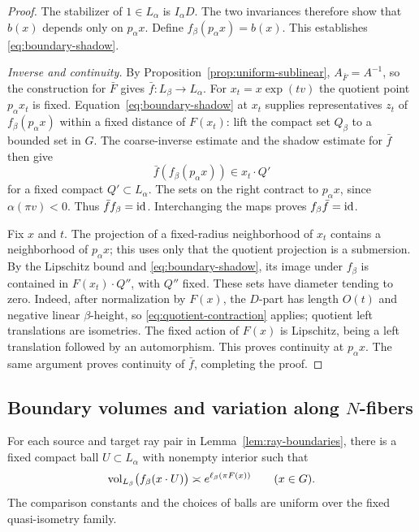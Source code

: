 \begin{proof}
The stabilizer of $1\in L_\alpha$ is $I_\alpha D$.
The two invariances therefore show that $b(x)$ depends only on
$p_\alpha x$.  Define $f_\beta(p_\alpha x)=b(x)$.
This establishes \eqref{eq:boundary-shadow}.

\smallskip
\noindent\emph{Inverse and continuity.}
By Proposition~\ref{prop:uniform-sublinear},
$A_{\bar F}=A^{-1}$, so the construction for $\bar F$ gives
$\bar f:L_\beta\to L_\alpha$.
For $x_t=x\exp(tv)$ the quotient point $p_\alpha x_t$ is fixed.
Equation~\eqref{eq:boundary-shadow} at $x_t$ supplies representatives
$z_t$ of $f_\beta(p_\alpha x)$ within a fixed distance of $F(x_t)$:
lift the compact set $Q_\beta$ to a bounded set in $G$.
The coarse-inverse estimate and the shadow estimate for $\bar f$
then give
\[
 \bar f(f_\beta(p_\alpha x))\in x_t\cdot Q'
\]
for a fixed compact $Q'\subset L_\alpha$.
The sets on the right contract to $p_\alpha x$, since
$\alpha(\pi v)<0$.  Thus $\bar f f_\beta=\operatorname{id}$.
Interchanging the maps proves $f_\beta\bar f=\operatorname{id}$.

Fix $x$ and $t$.  The projection of a fixed-radius neighborhood
of $x_t$ contains a neighborhood of $p_\alpha x$; this uses only
that the quotient projection is a submersion.
By the Lipschitz bound and \eqref{eq:boundary-shadow}, its image
under $f_\beta$ is contained in $F(x_t)\cdot Q''$, with $Q''$
fixed.  These sets have diameter tending to zero.
Indeed, after normalization by $F(x)$, the $D$-part has length
$O(t)$ and negative linear $\beta$-height, so
\eqref{eq:quotient-contraction} applies; quotient left translations
are isometries.  The fixed action of $F(x)$ is Lipschitz, being
a left translation followed by an automorphism.
This proves continuity at $p_\alpha x$.  The same argument proves
continuity of $\bar f$, completing the proof.
\end{proof}

\subsection{Boundary volumes and variation along \texorpdfstring{$N$}{N}-fibers}

\begin{lemma}
\label{lem:boundary-volume}
For each source and target ray pair in Lemma~\ref{lem:ray-boundaries},
there is a fixed compact ball $U\subset L_\alpha$ with nonempty
interior such that
\begin{equation}
\label{eq:boundary-volume}
 \operatorname{vol}_{L_\beta}\bigl(f_\beta(x\cdot U)\bigr)
 \asymp e^{\ell_\beta(\pi F(x))}
 \qquad(x\in G).
\end{equation}
The comparison constants and the choices of balls are uniform
over the fixed quasi-isometry family.
\end{lemma}


